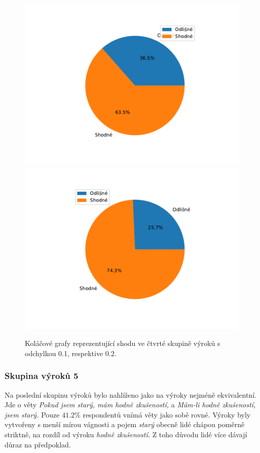     \begin{figure}[H]
    \caption{Koláčové grafy reprezentující shodu ve čtvrté skupině výrok\r u s odchylkou 0.1, respektive 0.2.}
                \includegraphics[scale=0.5]{template-fig/group3.pdf}
                \includegraphics[scale=0.5]{template-fig/group33.pdf}
            \end{figure}

\subsubsection{Skupina výrok\r u 5}
Na poslední skupinu výrok\r u bylo nahlíženo jako na výroky nejméně ekvivalentní. Jde o věty \textit{\clqq Pokud jsem starý, mám hodně zkušeností,\crqq }  \space a \textit{\clqq Mám-li hodně zkušeností, jsem starý.\crqq } \space Pouze $41.2 $\space$ \%$ respondent\r u vnímá věty jako sobě rovné. Výroky byly vytvořeny s menší mírou vágnosti a pojem \textit{\clqq starý\crqq } obecně lidé chápou poměrně striktně, na rozdíl od výroku \textit{\clqq hodně zkušeností. \crqq  \space} Z toho d\r uvodu lidé více dávají d\r uraz na předpoklad.

